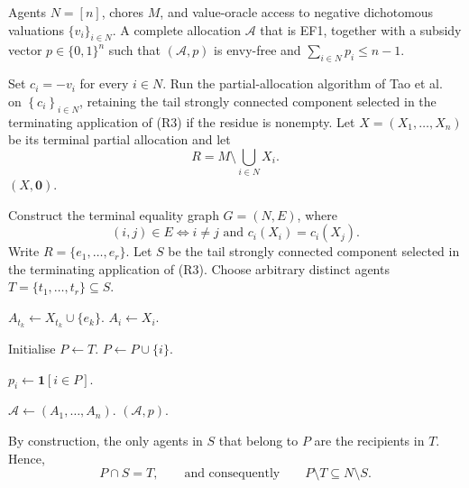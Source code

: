 \documentclass[sigconf,anonymous]{aamas}
\newcommand{\agents}{N}
\newcommand{\items}{M}
\newcommand{\cost}{c}
\newcommand{\set}[1]{\left\{#1\right\}}
\newcommand{\abs}[1]{\left\lvert#1\right\rvert}
\theoremstyle{acmplain}
\theoremstyle{acmdefinition}
\theoremstyle{acmplain}
\begin{document}
\begin{algorithm}[H]
\caption{EF1 allocation with at most one unit of subsidy per agent for negative dichotomous valuations}
\label{alg:main}
\begin{algorithmic}[1]
\Require Agents $N=[n]$, chores $M$, and value-oracle access to negative
dichotomous valuations $\{v_i\}_{i\in N}$.
\Ensure A complete allocation $\mathcal{A}$ that is EF1, together with a
subsidy vector $p\in\{0,1\}^n$ such that $(\mathcal{A},p)$ is envy-free and
$\sum_{i\in N}p_i\le n-1$.

\State Set $c_i=-v_i$ for every $i\in N$.
\State Run the partial-allocation algorithm of Tao et al.~\cite{tao2025existence} on $\set{\cost_i}_{i\in\agents}$, retaining the tail strongly connected component selected in the terminating application of  \textnormal{(R3)} if the residue is nonempty.
\State Let $X=(X_1,\dots,X_n)$ be its terminal partial allocation and let
\[
R=\items\setminus\bigcup_{i\in\agents}X_i .
       \]
    \State \Return $(X,\mathbf 0)$.
\EndIf

\State Construct the terminal equality graph $G=(\agents,E)$, where
       \[
       (i,j)\in E
       \iff
       i\neq j
       \text{ and }
       \cost_i(X_i)=\cost_i(X_j).
       \]
\State Write $R=\{e_1,\ldots,e_r\}$.
\State Let $S$ be the tail strongly connected component selected in the
       terminating application of \textnormal{(R3)}.
       \Comment{$r<\abs S$}
\State Choose arbitrary distinct agents
      $T=\{t_1,\ldots,t_r\}\subseteq S$.

    \State $A_{t_k}\gets X_{t_k}\cup\{e_k\}$.
\EndFor
{}
    \State $A_i\gets X_i$.
\EndFor

\State Initialise $P\gets T$.
    \State $P\gets P\cup\{i\}$.
\EndWhile

    \State $p_i\gets \mathbf{1}[i\in P]$.
\EndFor

\State $\mathcal{A}\gets(A_1,\ldots,A_n)$.
\State \Return $(\mathcal{A},p)$.
\end{algorithmic}
\end{algorithm}


By construction, the only agents in $S$ that belong to $P$ are the recipients in $T$. Hence,
\begin{equation}
\label{eq:Pstructure}
P\cap S=T,
\qquad\text{and consequently}\qquad
P\setminus T\subseteq N\setminus S.
\end{equation}
\end{document}
